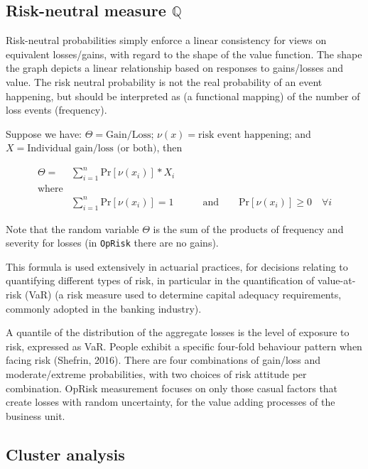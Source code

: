 \documentclass[]{DissertateUSU}
\begin{document}
\subsection{Risk-neutral measure $\mathbb{Q}$}

Risk-neutral probabilities simply enforce a linear consistency for views
on equivalent losses/gains, with regard to the shape of the value
function. The shape the graph depicts a linear relationship based on
responses to gains/losses and value. The risk neutral probability is not
the real probability of an event happening, but should be interpreted as
(a functional mapping) of the number of loss events (frequency).\medskip

Suppose we have: \(\Theta = \mbox{Gain/Loss}\);
\(\nu(x) = \mbox{risk event happening}\); and
\(X = \mbox{Individual gain/loss (or both)}\), then

\begin{eqnarray}\label{eqn3}
\Theta = &\sum_{i=1}^{n}\mbox{Pr}[\nu (x_{i})]*X_i & \\
 \mbox{where} \nonumber\\
&\sum_{i=1}^{n}\mbox{Pr}[\nu (x_{i})] = 1 &\qquad \mbox{and} \qquad \mbox{Pr}[\nu (x_{i})] \geq 0 \quad \forall i\nonumber
\end{eqnarray}

Note that the random variable \(\Theta\) is the sum of the products of
frequency and severity for losses (in \texttt{OpRisk} there are no
gains).\medskip

This formula is used extensively in actuarial practices, for decisions
relating to quantifying different types of risk, in particular in the
quantification of value-at-risk (VaR) (a risk measure used to determine
capital adequacy requirements, commonly adopted in the banking
industry).\medskip

A quantile of the distribution of the aggregate losses is the level of
exposure to risk, expressed as VaR. People exhibit a specific four-fold
behaviour pattern when facing risk (Shefrin, 2016). There are four
combinations of gain/loss and moderate/extreme probabilities, with two
choices of risk attitude per combination. OpRisk measurement focuses on
only those casual factors that create losses with random uncertainty,
for the value adding processes of the business unit.

\subsection{Cluster analysis}
\end{document}
